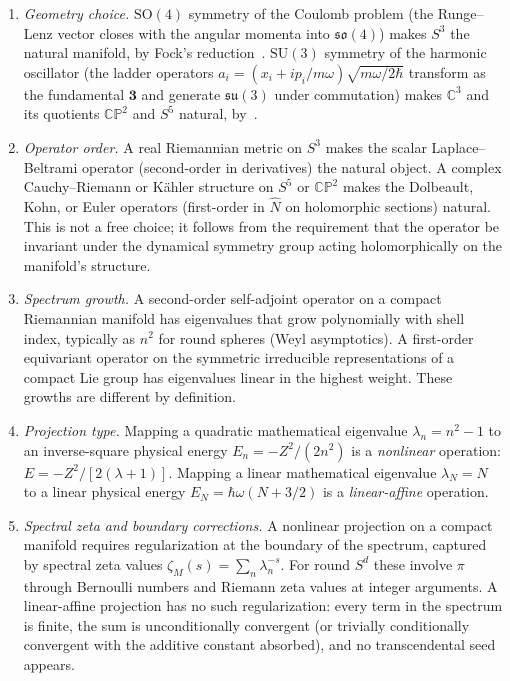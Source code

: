 \documentclass[twocolumn,pra,amsmath,amssymb,superscriptaddress]{revtex4-2}
\begin{document}
\begin{enumerate}
\item \emph{Geometry choice.}  $\mathrm{SO}(4)$ symmetry of the
  Coulomb problem (the Runge--Lenz vector closes with the angular
  momenta into $\mathfrak{so}(4)$) makes $S^3$ the natural
  manifold, by Fock's reduction~\cite{fock1935}.  $\mathrm{SU}(3)$
  symmetry of the harmonic oscillator (the ladder operators
  $a_i = (x_i + i p_i / m\omega) \sqrt{m\omega / 2\hbar}$
  transform as the fundamental $\mathbf{3}$ and generate
  $\mathfrak{su}(3)$ under commutation) makes $\mathbb{C}^3$ and
  its quotients $\mathbb{CP}^2$ and $S^5$ natural,
  by~\cite{jauchhill1940}.

\item \emph{Operator order.}  A real Riemannian metric on $S^3$
  makes the scalar Laplace--Beltrami operator (second-order in
  derivatives) the natural object.  A complex Cauchy--Riemann or
  K\"ahler structure on $S^5$ or $\mathbb{CP}^2$ makes the
  Dolbeault, Kohn, or Euler operators (first-order in $\hat{N}$
  on holomorphic sections) natural.  This is not a free choice;
  it follows from the requirement that the operator be invariant
  under the dynamical symmetry group acting holomorphically on
  the manifold's structure.

\item \emph{Spectrum growth.}  A second-order self-adjoint
  operator on a compact Riemannian manifold has eigenvalues that
  grow polynomially with shell index, typically as $n^2$ for
  round spheres (Weyl asymptotics).  A first-order equivariant
  operator on the symmetric irreducible representations of a
  compact Lie group has eigenvalues linear in the highest weight.
  These growths are different by definition.

\item \emph{Projection type.}  Mapping a quadratic mathematical
  eigenvalue $\lambda_n = n^2 - 1$ to an inverse-square physical
  energy $E_n = -Z^2 / (2 n^2)$ is a \emph{nonlinear} operation:
  $E = -Z^2 / [2(\lambda + 1)]$.  Mapping a linear mathematical
  eigenvalue $\lambda_N = N$ to a linear physical energy $E_N =
  \hbar\omega(N + 3/2)$ is a \emph{linear-affine} operation.

\item \emph{Spectral zeta and boundary corrections.}  A nonlinear
  projection on a compact manifold requires regularization at the
  boundary of the spectrum, captured by spectral zeta values
  $\zeta_M(s) = \sum_n \lambda_n^{-s}$.  For round $S^d$ these
  involve $\pi$ through Bernoulli numbers and Riemann zeta values
  at integer arguments.  A linear-affine projection has no such
  regularization: every term in the spectrum is finite, the sum
  is unconditionally convergent (or trivially conditionally
  convergent with the additive constant absorbed), and no
  transcendental seed appears.


\end{enumerate}
\end{document}
